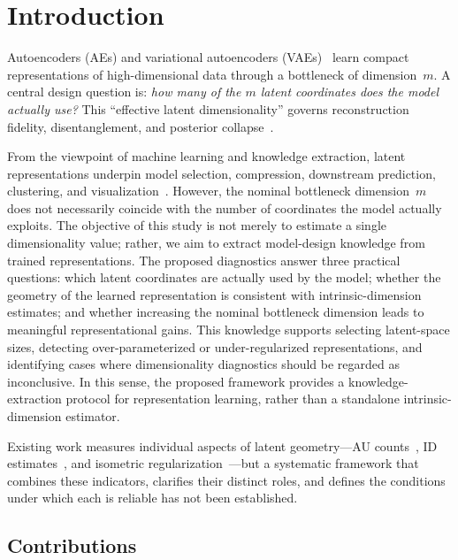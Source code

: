 \documentclass[make,article,submit,pdftex,moreauthors]{Definitions/mdpi}
\begin{document}
\section{Introduction}\label{sec:intro}

Autoencoders (AEs) and variational autoencoders (VAEs)~\cite{kingma2014vae}
learn compact representations of high-dimensional data through a bottleneck
of dimension~$m$.
A central design question is: \emph{how many of the $m$ latent coordinates
does the model actually use?}
This ``effective latent dimensionality'' governs reconstruction fidelity,
disentanglement, and posterior collapse~\cite{lucas2019elbo}.

From the viewpoint of machine learning and knowledge extraction, latent
representations underpin model selection, compression, downstream prediction,
clustering, and visualization~\cite{bengio2013representation}.
However, the nominal bottleneck dimension~$m$ does not necessarily coincide
with the number of coordinates the model actually exploits.
The objective of this study is not merely to estimate a single dimensionality
value; rather, we aim to extract model-design knowledge from trained
representations.
The proposed diagnostics answer three practical questions:
which latent coordinates are actually used by the model;
whether the geometry of the learned representation is consistent with
intrinsic-dimension estimates; and
whether increasing the nominal bottleneck dimension leads to meaningful
representational gains.
This knowledge supports selecting latent-space sizes, detecting
over-parameterized or under-regularized representations, and identifying
cases where dimensionality diagnostics should be regarded as inconclusive.
In this sense, the proposed framework provides a knowledge-extraction
protocol for representation learning, rather than a standalone
intrinsic-dimension estimator.

Existing work measures individual aspects of latent geometry---AU
counts~\cite{lucas2019elbo,higgins2017betavae}, ID
estimates~\cite{facco2017twonn,levina2005mle}, and isometric
regularization~\cite{kato2020rdae}---but a systematic framework that
combines these indicators, clarifies their distinct roles, and defines the
conditions under which each is reliable has not been established.

\subsection{Contributions}
\end{document}
